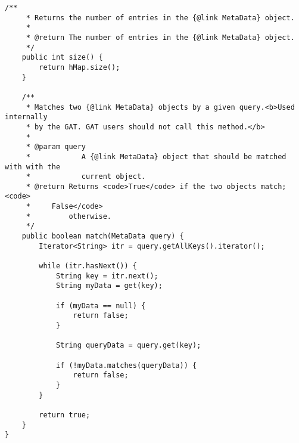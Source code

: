 \begin{Verbatim}[fontsize=\small]
	/**
	 * Returns the number of entries in the {@link MetaData} object.
	 * 
	 * @return The number of entries in the {@link MetaData} object.
	 */
	public int size() {
		return hMap.size();
	}

	/**
	 * Matches two {@link MetaData} objects by a given query.<b>Used internally
	 * by the GAT. GAT users should not call this method.</b>
	 * 
	 * @param query
	 *            A {@link MetaData} object that should be matched with with the
	 *            current object.
	 * @return Returns <code>True</code> if the two objects match; <code>
	 *     False</code>
	 *         otherwise.
	 */
	public boolean match(MetaData query) {
		Iterator<String> itr = query.getAllKeys().iterator();

		while (itr.hasNext()) {
			String key = itr.next();
			String myData = get(key);

			if (myData == null) {
				return false;
			}

			String queryData = query.get(key);

			if (!myData.matches(queryData)) {
				return false;
			}
		}

		return true;
	}
}
\end{Verbatim}